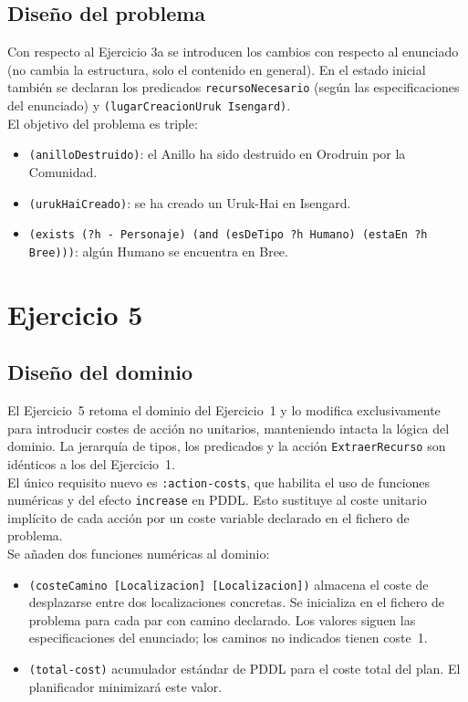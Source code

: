 \documentclass[10pt]{article}
\begin{document}
 
\subsection{Diseño del problema}
 
Con respecto al Ejercicio 3a se introducen los cambios con respecto al enunciado (no cambia la estructura, solo el contenido en general). En el estado inicial también se declaran los predicados \texttt{recursoNecesario} (según las especificaciones del enunciado) y \texttt{(lugarCreacionUruk Isengard)}.\\
 
El objetivo del problema es triple:
\begin{itemize}[label=-]
    \item \texttt{(anilloDestruido)}: el Anillo ha sido destruido en Orodruin por la Comunidad.
    \item \texttt{(urukHaiCreado)}: se ha creado un Uruk-Hai en Isengard.
    \item \texttt{(exists (?h - Personaje) (and (esDeTipo ?h Humano) (estaEn ?h Bree)))}: algún Humano se encuentra en Bree.
\end{itemize}
 
\section{Ejercicio 5}
 
\subsection{Diseño del dominio}
 
El Ejercicio~5 retoma el dominio del Ejercicio~1 y lo modifica exclusivamente para introducir costes de acción no unitarios, manteniendo intacta la lógica del dominio. La jerarquía de tipos, los predicados y la acción \texttt{ExtraerRecurso} son idénticos a los del Ejercicio~1.\\
 
El único requisito nuevo es \texttt{:action-costs}, que habilita el uso de funciones numéricas y del efecto \texttt{increase} en PDDL. Esto sustituye al coste unitario implícito de cada acción por un coste variable declarado en el fichero de problema.\\
 
Se añaden dos funciones numéricas al dominio:
\begin{itemize}[label=-]
    \item \texttt{(costeCamino [Localizacion] [Localizacion])} almacena el coste de desplazarse entre dos localizaciones concretas. Se inicializa en el fichero de problema para cada par con camino declarado. Los valores siguen las especificaciones del enunciado; los caminos no indicados tienen coste~1.
    \item \texttt{(total-cost)} acumulador estándar de PDDL para el coste total del plan. El planificador minimizará este valor.
\end{itemize}
 
\end{document}
